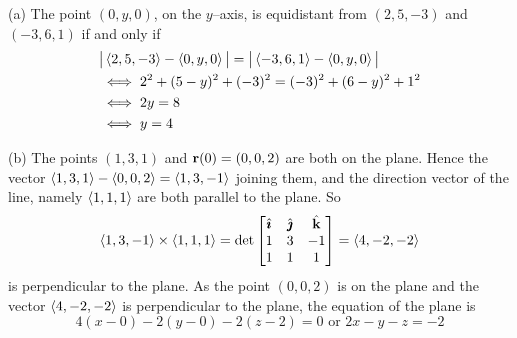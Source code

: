 \begin{solution}
(a) 
The point $(0,y,0)$, on the $y$--axis, is equidistant from 
                $(2, 5, -3)$ and $(-3, 6, 1)$ if and only if
\begin{align*}
&\big|\left< 2, 5, -3\right>-\left< 0,y,0\right>\big|
         =\big|\left< -3, 6, 1\right>-\left< 0,y,0\right>\big| \\
&\iff 2^2+(5-y)^2+(-3)^2=(-3)^2+(6-y)^2+1^2 \\
&\iff 2y=8 \\
&\iff y=4
\end{align*}

(b) 
The points $(1,3,1)$ and $\mathbf{r}(0)=(0,0,2)$ are both on the plane.
Hence the vector $\left< 1,3,1\right>-\left< 0,0,2\right>=\left< 1,3,-1\right>$ 
joining them,
and the direction vector of the line, namely $\left< 1,1,1\right>$ are 
both parallel to the plane. So 
\begin{equation*}
\left< 1,3,-1\right>\times \left< 1,1,1\right>
=\det\left[\begin{matrix} \hat{\pmb{\imath}} &\hat{\pmb{\jmath}} &\hat{\mathbf{k}} \\ 
                           1&3&-1 \\ 
                           1&1&1 \end{matrix}\right]
= \left< 4,-2,-2\right>
\end{equation*}
is perpendicular to the plane. As the point $(0,0,2)$ is on the plane
and the vector  $\left< 4,-2,-2\right>$ is perpendicular to the plane, the
equation of the plane is
\begin{equation*}
4(x-0)-2(y-0)-2(z-2)=0\text{ or } 2x-y-z=-2
\end{equation*}
\end{solution}


\subsection*{\Application}


